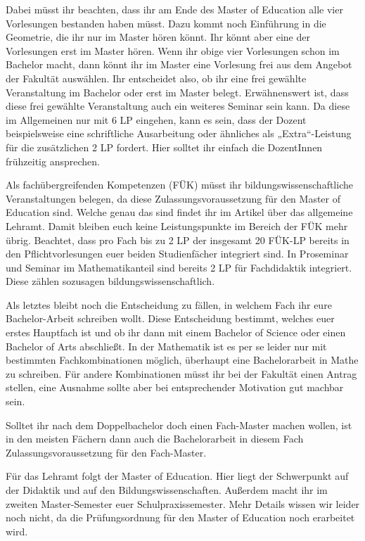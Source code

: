 Dabei müsst ihr beachten, dass ihr am Ende des Master of Education alle vier Vorlesungen bestanden haben müsst. Dazu kommt noch Einführung in die Geometrie, die ihr nur im Master hören könnt. Ihr könnt aber eine der Vorlesungen erst im Master hören. Wenn ihr obige vier Vorlesungen schon im Bachelor macht, dann könnt ihr im Master eine Vorlesung frei aus dem Angebot der Fakultät auswählen. Ihr entscheidet also, ob ihr eine frei gewählte Veranstaltung im Bachelor oder erst im Master belegt. Erwähnenswert ist, dass diese frei gewählte Veranstaltung auch ein weiteres Seminar sein kann. Da diese im Allgemeinen nur mit 6 \gls{LP} eingehen, kann es sein, dass der Dozent beispielsweise eine schriftliche Ausarbeitung oder ähnliches als „Extra“-Leistung für die zusätzlichen 2 \gls{LP} fordert. Hier solltet ihr einfach die DozentInnen frühzeitig ansprechen.

Als fachübergreifenden Kompetenzen (FÜK) müsst ihr bildungswissenschaftliche Veranstaltungen belegen, da diese Zulassungsvoraussetzung für den Master of Education sind. Welche genau das sind findet ihr im Artikel über das allgemeine Lehramt. Damit bleiben euch keine Leistungspunkte im Bereich der FÜK mehr übrig. Beachtet, dass pro Fach bis zu 2 \gls{LP} der insgesamt 20 FÜK-\gls{LP} bereits in den Pflichtvorlesungen euer beiden Studienfächer integriert sind. In Proseminar und Seminar im Mathematikanteil sind bereits 2 \gls{LP} für Fachdidaktik integriert. Diese zählen sozusagen bildungswissenschaftlich.

Als letztes bleibt noch die Entscheidung zu fällen, in welchem Fach ihr eure Bachelor-Arbeit schreiben wollt. Diese Entscheidung bestimmt, welches euer erstes Hauptfach ist und ob ihr dann mit einem Bachelor of Science oder einen Bachelor of Arts abschließt. In der Mathematik ist es per se leider nur mit bestimmten Fachkombinationen möglich, überhaupt eine Bachelorarbeit in Mathe zu schreiben. Für andere Kombinationen müsst ihr bei der Fakultät einen Antrag stellen, eine Ausnahme sollte aber bei entsprechender Motivation gut machbar sein.

Solltet ihr nach dem Doppelbachelor doch einen Fach-Master machen wollen, ist in den meisten Fächern dann auch die Bachelorarbeit in diesem Fach Zulassungsvoraussetzung für den Fach-Master.

Für das Lehramt folgt der Master of Education. Hier liegt der Schwerpunkt auf der Didaktik und auf den Bildungswissenschaften. Außerdem macht ihr im zweiten Master-Semester euer Schulpraxissemester. Mehr Details wissen wir leider noch nicht, da die Prüfungsordnung für den Master of Education noch erarbeitet wird.
